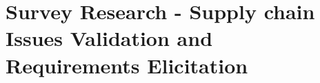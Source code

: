 \chapter{Survey Research - Supply chain Issues Validation and Requirements Elicitation}
\label{chap:survey}
\minitoc \mtcskip \noindent







